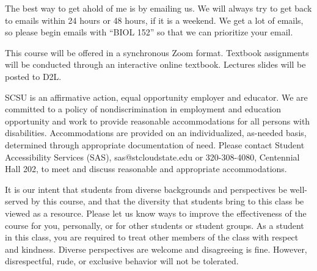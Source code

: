 \documentclass{tufte-handout}
\begin{document}
\begin{fullwidth}
 The best way to get ahold of me is by emailing us. We will always try to get back to emails within 24 hours or 48 hours, if it is a weekend. We get a lot of emails, so please begin emails with ``BIOL 152'' so that we can prioritize your email. 

 This course will be offered in a synchronous Zoom format. Textbook assignments will be conducted through an interactive online textbook. Lectures slides will be posted to D2L. 


 SCSU is an affirmative action, equal opportunity employer and educator. We are committed to a policy of nondiscrimination in employment and education opportunity and work to provide reasonable accommodations for all persons with disabilities. Accommodations are provided on an individualized, as-needed basis, determined through appropriate documentation of need. Please contact Student Accessibility Services (SAS), sas@stcloudstate.edu or 320-308-4080, Centennial Hall 202, to meet and discuss reasonable and appropriate accommodations. 

 It is our intent that students from diverse backgrounds and perspectives be well-served by this course, and that the diversity that students bring to this class be viewed as a resource. Please let us know ways to improve the effectiveness of the course for you, personally, or for other students or student groups. As a student in this class, you are required to treat other members of the class with respect and kindness. Diverse perspectives are welcome and disagreeing is fine. However, disrespectful, rude, or exclusive behavior will not be tolerated.


\end{fullwidth}

\end{document}
